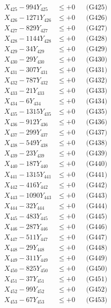 \documentclass[a4paper,10pt]{article}
\begin{document}
{\begin{align}
X_{425} - 994Y_{425} &\leq +0 && \text{(G425)} \\
X_{426} - 1271Y_{426} &\leq +0 && \text{(G426)} \\
X_{427} - 829Y_{427} &\leq +0 && \text{(G427)} \\
X_{428} - 1144Y_{428} &\leq +0 && \text{(G428)} \\
X_{429} - 34Y_{429} &\leq +0 && \text{(G429)} \\
X_{430} - 29Y_{430} &\leq +0 && \text{(G430)} \\
\allowbreak
X_{431} - 307Y_{431} &\leq +0 && \text{(G431)} \\
X_{432} - 787Y_{432} &\leq +0 && \text{(G432)} \\
X_{433} - 21Y_{433} &\leq +0 && \text{(G433)} \\
X_{434} - 6Y_{434} &\leq +0 && \text{(G434)} \\
X_{435} - 1315Y_{435} &\leq +0 && \text{(G435)} \\
X_{436} - 912Y_{436} &\leq +0 && \text{(G436)} \\
X_{437} - 299Y_{437} &\leq +0 && \text{(G437)} \\
X_{438} - 549Y_{438} &\leq +0 && \text{(G438)} \\
X_{439} - 23Y_{439} &\leq +0 && \text{(G439)} \\
X_{440} - 187Y_{440} &\leq +0 && \text{(G440)} \\
\allowbreak
X_{441} - 1315Y_{441} &\leq +0 && \text{(G441)} \\
X_{442} - 416Y_{442} &\leq +0 && \text{(G442)} \\
X_{443} - 1090Y_{443} &\leq +0 && \text{(G443)} \\
X_{444} - 32Y_{444} &\leq +0 && \text{(G444)} \\
X_{445} - 483Y_{445} &\leq +0 && \text{(G445)} \\
X_{446} - 287Y_{446} &\leq +0 && \text{(G446)} \\
X_{447} - 511Y_{447} &\leq +0 && \text{(G447)} \\
X_{448} - 29Y_{448} &\leq +0 && \text{(G448)} \\
X_{449} - 311Y_{449} &\leq +0 && \text{(G449)} \\
X_{450} - 825Y_{450} &\leq +0 && \text{(G450)} \\
\allowbreak
X_{451} - 37Y_{451} &\leq +0 && \text{(G451)} \\
X_{452} - 99Y_{452} &\leq +0 && \text{(G452)} \\
X_{453} - 67Y_{453} &\leq +0 && \text{(G453)} \\

\end{align}}
\end{document}
